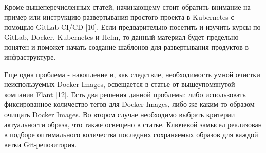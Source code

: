 Кроме вышеперечисленных статей, начинающему стоит обратить внимание на пример или инструкцию развертывания простого проекта в Kubernetes с помощью GitLab CI/CD [10]. Если предварительно посетить и изучить курсы по GitLab, Docker, Kubernetes и Helm, то данный материал будет предельно понятен и поможет начать создание шаблонов для развертывания продуктов в инфраструктуре.

Еще одна проблема - накопление и, как следствие, необходимость умной очистки неиспользуемых Docker Images, освещается в статье от вышеупомянутой компании Flant [12]. Есть два решения данной проблемы: либо использовать фиксированное количество тегов для Docker Images, либо же каким-то образом очищать Docker Images. Во втором случае необходимо выбрать критерии актуальности образа, что также освещено в статье. Ключевой замысел реализован в подборе оптимального количества последних сохраняемых образов для каждой ветки Git-репозитория.


